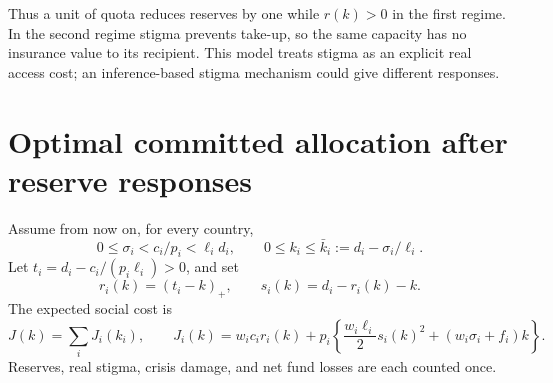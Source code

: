 \documentclass[11pt,a4paper]{article}
\theoremstyle{definition}
\theoremstyle{remark}
\begin{document}
Thus a unit of quota reduces reserves by one while $r(k)>0$ in the first regime. In the second regime stigma prevents take-up, so the same capacity has no insurance value to its recipient. This model treats stigma as an explicit real access cost; an inference-based stigma mechanism could give different responses.
\section{Optimal committed allocation after reserve responses}
Assume from now on, for every country,
\[
 0\le\sigma_i<c_i/p_i<\ell_id_i,
 \qquad 0\le k_i\le\bar k_i:=d_i-\sigma_i/\ell_i.
\]
Let $t_i=d_i-c_i/(p_i\ell_i)>0$, and set
\[
 r_i(k)=(t_i-k)_+,\qquad s_i(k)=d_i-r_i(k)-k.
\]
The expected social cost is
\[
 J(k)=\sum_iJ_i(k_i),\qquad
 J_i(k)=w_ic_ir_i(k)+p_i\left\{
       \frac{w_i\ell_i}{2}s_i(k)^2+(w_i\sigma_i+f_i)k\right\}. \tag{2}
\]
Reserves, real stigma, crisis damage, and net fund losses are each counted once.
\end{document}
